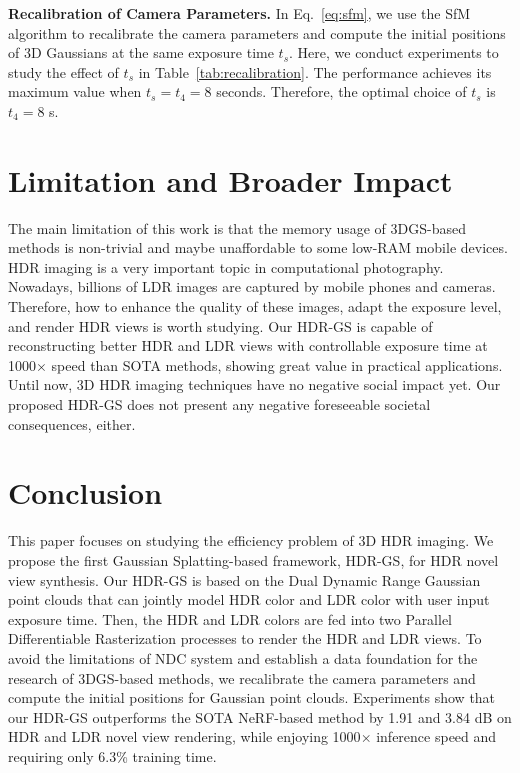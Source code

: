 \documentclass{article}
\begin{document}
\vspace{1mm}
\noindent \textbf{Recalibration of Camera Parameters.} In Eq.~\eqref{eq:sfm}, we use the SfM algorithm to recalibrate the camera parameters and compute the initial positions of 3D Gaussians at the same exposure time $t_s$. Here, we conduct experiments to study the effect of $t_s$ in Table~\ref{tab:recalibration}. The performance achieves its maximum value when $t_s = t_4 = 8$ seconds. Therefore, the optimal choice of $t_s$ is $t_4 = 8$ s.


\section{Limitation and Broader Impact}
\label{sec:limitation}

The main limitation of this work is that the memory usage of 3DGS-based methods is non-trivial and maybe unaffordable to some low-RAM mobile devices. HDR imaging is a very important topic in computational photography. Nowadays, billions of LDR images are captured by mobile phones and cameras. Therefore, how to enhance the quality of these images, adapt the exposure level, and render HDR views is worth studying. Our HDR-GS is capable of reconstructing better HDR and LDR views with controllable exposure time at 1000$\times$ speed than SOTA methods, showing great value in practical applications. Until now, 3D HDR imaging techniques have no negative social impact yet. Our proposed HDR-GS does not present any negative foreseeable societal consequences, either.

\section{Conclusion}

This paper focuses on studying the efficiency problem of 3D HDR imaging. We propose the first Gaussian Splatting-based framework, HDR-GS, for HDR novel view synthesis. Our HDR-GS is based on the Dual Dynamic Range Gaussian point clouds that can jointly model HDR color and LDR color with user input exposure time. Then, the HDR and LDR colors are fed into two Parallel Differentiable Rasterization processes to render the HDR and LDR views. To avoid the limitations of NDC system and establish a data foundation for the research of 3DGS-based methods, we recalibrate the camera parameters and compute the initial positions for Gaussian point clouds. Experiments show that our HDR-GS outperforms the SOTA NeRF-based method by 1.91 and 3.84 dB on HDR and LDR novel view rendering, while enjoying 1000$\times$ inference speed and requiring only 6.3\% training time.
\end{document}
